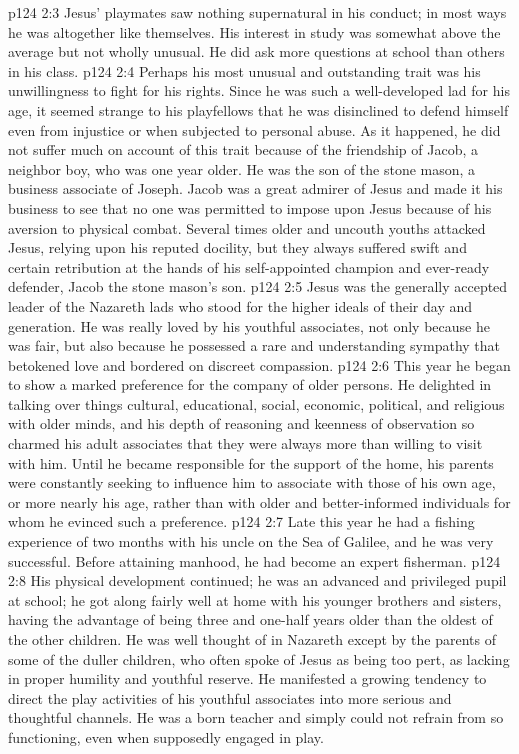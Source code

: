 \vs p124 2:3 Jesus’ playmates saw nothing supernatural in his conduct; in most ways he was altogether like themselves. His interest in study was somewhat above the average but not wholly unusual. He did ask more questions at school than others in his class.
\pc \vs p124 2:4 Perhaps his most unusual and outstanding trait was his unwillingness to fight for his rights. Since he was such a well\hyp{}developed lad for his age, it seemed strange to his playfellows that he was disinclined to defend himself even from injustice or when subjected to personal abuse. As it happened, he did not suffer much on account of this trait because of the friendship of Jacob, a neighbor boy, who was one year older. He was the son of the stone mason, a business associate of Joseph. Jacob was a great admirer of Jesus and made it his business to see that no one was permitted to impose upon Jesus because of his aversion to physical combat. Several times older and uncouth youths attacked Jesus, relying upon his reputed docility, but they always suffered swift and certain retribution at the hands of his self\hyp{}appointed champion and ever\hyp{}ready defender, Jacob the stone mason’s son.
\vs p124 2:5 Jesus was the generally accepted leader of the Nazareth lads who stood for the higher ideals of their day and generation. He was really loved by his youthful associates, not only because he was fair, but also because he possessed a rare and understanding sympathy that betokened love and bordered on discreet compassion.
\vs p124 2:6 This year he began to show a marked preference for the company of older persons. He delighted in talking over things cultural, educational, social, economic, political, and religious with older minds, and his depth of reasoning and keenness of observation so charmed his adult associates that they were always more than willing to visit with him. Until he became responsible for the support of the home, his parents were constantly seeking to influence him to associate with those of his own age, or more nearly his age, rather than with older and better\hyp{}informed individuals for whom he evinced such a preference.
\vs p124 2:7 Late this year he had a fishing experience of two months with his uncle on the Sea of Galilee, and he was very successful. Before attaining manhood, he had become an expert fisherman.
\vs p124 2:8 His physical development continued; he was an advanced and privileged pupil at school; he got along fairly well at home with his younger brothers and sisters, having the advantage of being three and one\hyp{}half years older than the oldest of the other children. He was well thought of in Nazareth except by the parents of some of the duller children, who often spoke of Jesus as being too pert, as lacking in proper humility and youthful reserve. He manifested a growing tendency to direct the play activities of his youthful associates into more serious and thoughtful channels. He was a born teacher and simply could not refrain from so functioning, even when supposedly engaged in play.
